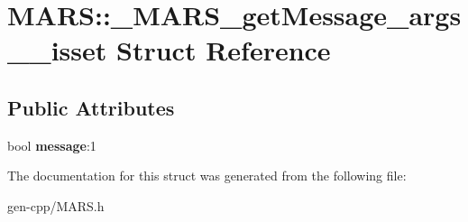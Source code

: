 \hypertarget{structMARS_1_1__MARS__getMessage__args____isset}{}\section{M\+A\+RS\+:\+:\+\_\+\+M\+A\+R\+S\+\_\+get\+Message\+\_\+args\+\_\+\+\_\+isset Struct Reference}
\label{structMARS_1_1__MARS__getMessage__args____isset}
\subsection*{Public Attributes}
\begin{DoxyCompactItemize}
\item 
\mbox{\label{structMARS_1_1__MARS__getMessage__args____isset_ae96ffe4c3358e2f61732520476c29887}} 
bool {\bfseries message}\+:1
\end{DoxyCompactItemize}


The documentation for this struct was generated from the following file\+:\begin{DoxyCompactItemize}
\item 
gen-\/cpp/M\+A\+R\+S.\+h\end{DoxyCompactItemize}
